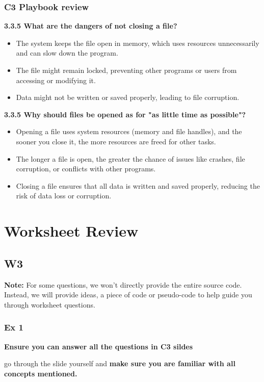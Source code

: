 \documentclass[
	11pt, %
]{beamer}
\begin{document}
\begin{frame}
	\frametitle{C3 Playbook review}
    \textbf{3.3.5 What are the dangers of not closing a file?}
    \begin{itemize}
        \item The system keeps the file open in memory, which uses resources unnecessarily and can slow down the program.
        \item  The file might remain locked, preventing other programs or users from accessing or modifying it.
        \item   Data might not be written or saved properly, leading to file corruption.
    \end{itemize}
    \textbf{3.3.5 Why should files be opened as for "as little time as possible"?}
    \begin{itemize}
        \item Opening a file uses system resources (memory and file handles), and the sooner you close it, the more resources are freed for other tasks.
        \item The longer a file is open, the greater the chance of issues like crashes, file corruption, or conflicts with other programs.
        \item Closing a file ensures that all data is written and saved properly, reducing the risk of data loss or corruption.
    \end{itemize}
\end{frame}


\section{Worksheet Review}

\subsection{W3}

\begin{frame}
	\textbf{Note:} For some questions, we won't directly provide the entire source code.
    Instead, we will provide ideas, a piece of code or pseudo-code to help guide you through worksheet questions.
\end{frame}



\begin{frame}
	\frametitle{Ex 1}
	
	\textbf{Ensure you can answer all the questions in C3 sildes}

    \bigskip
    \bigskip

    \quad go through the slide yourself and \textbf{make sure you are familiar with all concepts mentioned.}
\end{frame}
\end{document}
